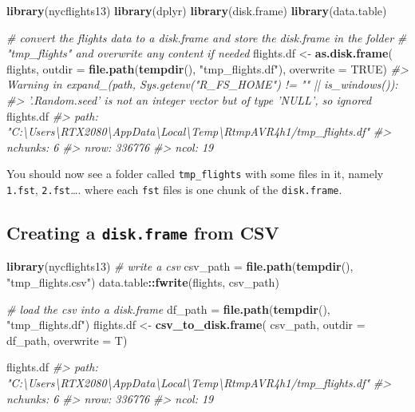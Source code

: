 \documentclass[]{book}
\newenvironment{Shaded}{\begin{snugshade}}{\end{snugshade}}
\newcommand{\CommentTok}[1]{\textcolor[rgb]{0.56,0.35,0.01}{\textit{#1}}}
\newcommand{\DataTypeTok}[1]{\textcolor[rgb]{0.13,0.29,0.53}{#1}}
\newcommand{\KeywordTok}[1]{\textcolor[rgb]{0.13,0.29,0.53}{\textbf{#1}}}
\newcommand{\NormalTok}[1]{#1}
\newcommand{\OperatorTok}[1]{\textcolor[rgb]{0.81,0.36,0.00}{\textbf{#1}}}
\newcommand{\OtherTok}[1]{\textcolor[rgb]{0.56,0.35,0.01}{#1}}
\newcommand{\StringTok}[1]{\textcolor[rgb]{0.31,0.60,0.02}{#1}}
\begin{document}
\begin{Shaded}
\begin{Highlighting}[]
\KeywordTok{library}\NormalTok{(nycflights13)}
\KeywordTok{library}\NormalTok{(dplyr)}
\KeywordTok{library}\NormalTok{(disk.frame)}
\KeywordTok{library}\NormalTok{(data.table)}

\CommentTok{# convert the flights data to a disk.frame and store the disk.frame in the folder}
\CommentTok{# "tmp_flights" and overwrite any content if needed}
\NormalTok{flights.df <-}\StringTok{ }\KeywordTok{as.disk.frame}\NormalTok{(}
\NormalTok{  flights, }
  \DataTypeTok{outdir =} \KeywordTok{file.path}\NormalTok{(}\KeywordTok{tempdir}\NormalTok{(), }\StringTok{"tmp_flights.df"}\NormalTok{),}
  \DataTypeTok{overwrite =} \OtherTok{TRUE}\NormalTok{)}
\CommentTok{#> Warning in expand_(path, Sys.getenv("R_FS_HOME") != "" || is_windows()):}
\CommentTok{#> '.Random.seed' is not an integer vector but of type 'NULL', so ignored}
\NormalTok{flights.df}
\CommentTok{#> path: "C:\textbackslash{}Users\textbackslash{}RTX2080\textbackslash{}AppData\textbackslash{}Local\textbackslash{}Temp\textbackslash{}RtmpAVR4h1/tmp_flights.df"}
\CommentTok{#> nchunks: 6}
\CommentTok{#> nrow: 336776}
\CommentTok{#> ncol: 19}
\end{Highlighting}
\end{Shaded}

You should now see a folder called \texttt{tmp\_flights} with some files in it, namely \texttt{1.fst}, \texttt{2.fst}\ldots. where each \texttt{fst} files is one chunk of the \texttt{disk.frame}.

\hypertarget{creating-a-disk.frame-from-csv}{%
\subsection{\texorpdfstring{Creating a \texttt{disk.frame} from CSV}{Creating a disk.frame from CSV}}\label{creating-a-disk.frame-from-csv}}

\begin{Shaded}
\begin{Highlighting}[]
\KeywordTok{library}\NormalTok{(nycflights13)}
\CommentTok{# write a csv}
\NormalTok{csv_path =}\StringTok{ }\KeywordTok{file.path}\NormalTok{(}\KeywordTok{tempdir}\NormalTok{(), }\StringTok{"tmp_flights.csv"}\NormalTok{)}
\NormalTok{data.table}\OperatorTok{::}\KeywordTok{fwrite}\NormalTok{(flights, csv_path)}

\CommentTok{# load the csv into a disk.frame}
\NormalTok{df_path =}\StringTok{ }\KeywordTok{file.path}\NormalTok{(}\KeywordTok{tempdir}\NormalTok{(), }\StringTok{"tmp_flights.df"}\NormalTok{)}
\NormalTok{flights.df <-}\StringTok{ }\KeywordTok{csv_to_disk.frame}\NormalTok{(}
\NormalTok{  csv_path, }
  \DataTypeTok{outdir =}\NormalTok{ df_path,}
  \DataTypeTok{overwrite =}\NormalTok{ T)}
  
\NormalTok{flights.df}
\CommentTok{#> path: "C:\textbackslash{}Users\textbackslash{}RTX2080\textbackslash{}AppData\textbackslash{}Local\textbackslash{}Temp\textbackslash{}RtmpAVR4h1/tmp_flights.df"}
\CommentTok{#> nchunks: 6}
\CommentTok{#> nrow: 336776}
\CommentTok{#> ncol: 19}
\end{Highlighting}
\end{Shaded}
\end{document}
